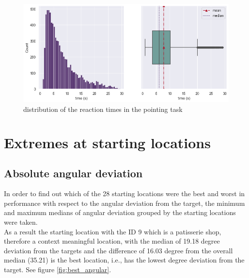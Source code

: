 \begin{figure}[!htb]
	\centering
	\includegraphics[width=150mm]{figures/RT_hist_box_23.png}
	\caption[Distribution of reaction times]{distribution of the  reaction times in the pointing task}
	\label{fig:rt_dists}
\end{figure}

\section{Extremes at starting locations}

\subsection{Absolute angular deviation}

In order to find out which of the 28 starting locations were the best and worst in performance with respect to the angular deviation from the target, the minimum and maximum medians of angular deviation grouped by the starting locations were taken.\\
As a result the starting location with the ID 9 which is a patisserie shop, therefore a context meaningful location, with the median of 19.18 degree deviation from the targets and the difference of 16.03 degree from the overall median (35.21) is the best location, i.e., has the lowest degree deviation from the target. See figure \ref{fig:best_angular}.\\

